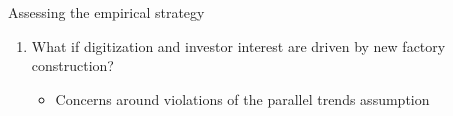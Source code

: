 \documentclass[aspectratio=169,t,11pt,table]{beamer}
\begin{document}
\begin{frame}{Assessing the empirical strategy}\label{robustness}
\begin{enumerate}
    \item  What if digitization and investor interest are driven by new factory construction?
    \begin{itemize}
        \item {\footnotesize Concerns around violations of the parallel trends assumption}
    \end{itemize}
     \vspace{4mm}
\end{enumerate}
\end{frame}
\end{document}
